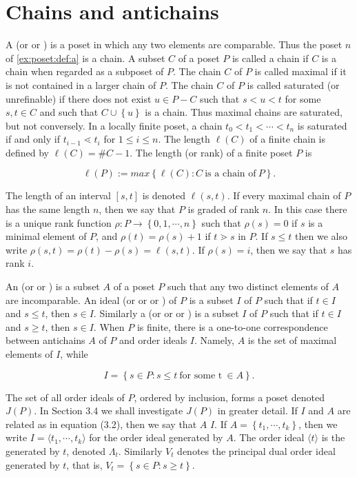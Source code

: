 \section{Chains and antichains}

A  (or  or ) is a poset in which any two elements are comparable. Thus the poset $n$ of \ref{ex:poset:def:a} is a chain. A subset $C$ of a poset $P$ is called a chain if $C$ is a chain when regarded as a subposet of $P$. The chain $C$ of $P$ is called maximal if it is not contained in a larger chain of $P$. The chain $C$ of $P$ is called saturated (or unrefinable) if there does not exist $u \in P - C$ such that $s < u < t$ for some $s, t \in C$ and such that $C \cup \left\{{u}\right\}$ is a chain. Thus maximal chains are saturated, but not conversely. In a locally finite poset, a chain $t_0 < t_1 < \cdots < t_n$ is saturated if and only if $t_{i-1} \lessdot t_i$ for $1 \leq i \leq n$. The length $\ell(C)$ of a finite chain is defined by $\ell(C) = \#C - 1$. The length (or rank) of a finite poset $P$ is

$$\ell(P) := max\left\{{\ell(C) : C ~\text{is a chain of}~ P}\right\}.$$

The length of an interval $[s, t]$ is denoted $\ell(s, t)$. If every maximal chain of $P$ has the same length $n$, then we say that $P$ is graded of rank $n$. In this case there is a unique rank function $\rho : P \to \left\{{0, 1, \cdots , n}\right\}$ such that $\rho(s) = 0$ if $s$ is a minimal element of $P$, and $\rho(t) = \rho(s) + 1$ if $t \gtrdot s$ in $P$. If $s \leq t$ then we also write $\rho(s, t) = \rho(t) - \rho(s) = \ell(s, t)$. If $\rho(s) = i$, then we say that $s$ has rank $i$.




An  (or  or ) is a subset $A$ of a poset $P$ such that any two distinct elements of $A$ are incomparable. An  ideal (or  or  or ) of $P$ is a subset $I$ of $P$ such that if $t \in I$ and $s \leq t$, then $s \in I$. Similarly a  (or  or  or  ) is a subset $I$ of $P$ such that if $t \in I$ and $s \geq t$, then $s \in I$. When $P$ is finite, there is a one-to-one correspondence between antichains $A$ of $P$ and order ideals $I$. Namely, $A$ is the set of maximal elements of $I$, while

$$I = \left\{{s \in P : s \leq t ~\text{for some t}~ \in A}\right\}.$$

The set of all order ideals of $P$, ordered by inclusion, forms a poset denoted $J(P)$. In Section 3.4 we shall investigate $J(P)$ in greater detail. If $I$ and $A$ are related as in equation (3.2), then we say that $A$  $I$. If $A = \left\{{t_1 , \cdots , t_k}\right\}$, then we write $I = \langle t_1 , \cdots , t_k \rangle$ for the order ideal generated by $A$. The order ideal $\langle t \rangle$ is the  generated by $t$, denoted $\Lambda_t$. Similarly $V_t$ denotes the principal dual order ideal generated by $t$, that is, $V_t = \left\{{s \in P : s \geq t}\right\}$.


